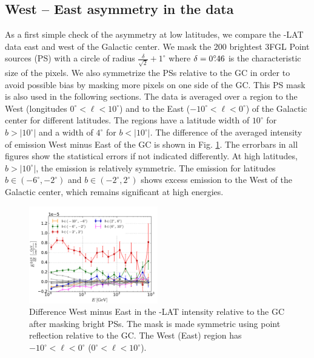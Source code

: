 \subsection{West -- East asymmetry in the data}
\label{sec:data_diff}

As a first simple check of the asymmetry at low latitudes, we compare the \Fermi-LAT data east and west of the Galactic center. 
We mask the 200 brightest 3FGL Point sources (PS)  with a circle of radius $\frac{\delta}{\sqrt{2}} + 1^\circ$ where $\delta = 0^\circ\!\!.46$ is the characteristic size of the pixels. We also symmetrize the PSs relative to the GC in order to avoid possible bias by masking more pixels on one side of the GC. 
This PS mask is also used in the following sections. 
The data is averaged over a region to the West (longitudes $0^\circ < \ell < 10^\circ$) and to the East ($-10^\circ < \ell  <  0^\circ$) of the Galactic center for different latitudes. The regions have a latitude width of $10^\circ$ for $b >|10^\circ|$ and a width of  $4^\circ$ for  $b <|10^\circ|$. 
The difference of the averaged intensity of emission West minus East of the GC is shown in Fig. \ref{fig:data_diff}. The errorbars in all figures show the statistical errors if not indicated differently.
At high latitudes, $b >|10^\circ|$, the emission is relatively symmetric. 
The emission for latitudes $b \in (-6^\circ, -2^\circ)$ and $b \in (-2^\circ, 2^\circ)$ shows excess emission to the West of the Galactic center, which remains significant at high energies. 


\begin{figure}[h]
\centering
 \includegraphics[width=0.5\textwidth]{plots/Difference_data_for_different_latitudes.pdf}
 \caption{Difference West minus East in the \Fermi-LAT intensity relative to the GC after masking bright PSs.
 The mask is made symmetric using point reflection relative to the GC.
 The West (East) region has $-10^\circ < \ell <0^\circ$ ($0^\circ < \ell <10^\circ$). }
 \label{fig:data_diff}
\end{figure}


